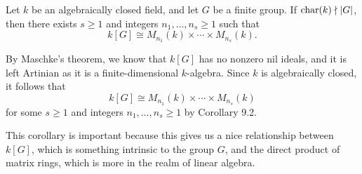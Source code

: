 \begin{cor}{}
Let $k$ be an algebraically closed field, and let $G$ be a finite group. If $\operatorname{char}(k) \nmid |G|$, then 
there exists $s \geq 1$ and integers $n_1, \dots, n_s \geq 1$ such that 
\[ k[G] \cong M_{n_1}(k) \times \cdots \times M_{n_s}(k). \]
\end{cor}
\begin{pf}
By Maschke's theorem, we know that $k[G]$ has no nonzero nil ideals, and it is left Artinian 
as it is a finite-dimensional $k$-algebra. Since $k$ is algebraically closed, it follows that 
\[ k[G] \cong M_{n_1}(k) \times \cdots \times M_{n_s}(k) \]
for some $s \geq 1$ and integers $n_1, \dots, n_s \geq 1$ by Corollary 9.2. 
\end{pf}

This corollary is important because this gives us a nice relationship between $k[G]$, which is 
something intrinsic to the group $G$, and the direct product of matrix rings, which is more in the 
realm of linear algebra.